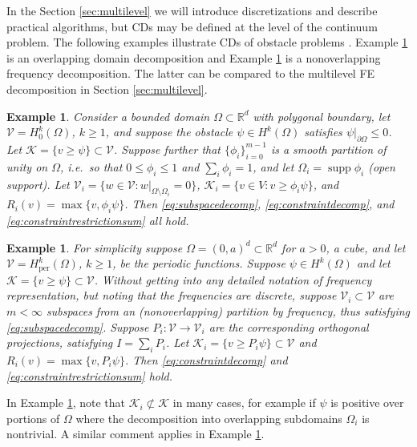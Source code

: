 \documentclass[letterpaper,final,12pt,reqno]{amsart}
\theoremstyle{cstyle}
\theoremstyle{dstyle}
\newtheorem{example}[theorem]{Example}
\numberwithin{equation}{section}
\numberwithin{figure}{section}
\numberwithin{table}{section}
\numberwithin{theorem}{section}
\newcommand{\RR}{\mathbb{R}}
\newcommand{\cK}{\mathcal{K}}
\newcommand{\cV}{\mathcal{V}}
\newcommand{\supp}{\operatorname{supp}}
\begin{document}
In the Section \ref{sec:multilevel} we will introduce discretizations and describe practical algorithms, but CDs may be defined at the level of the continuum problem.  The following examples illustrate CDs of obstacle problems \cite{GraeserKornhuber2009}.   Example \ref{ex:domaindecomposition} is an overlapping domain decomposition and Example \ref{ex:frequencydecomposition} is a nonoverlapping frequency decomposition.  The latter can be compared to the multilevel FE decomposition in Section \ref{sec:multilevel}.

\begin{example}  \label{ex:domaindecomposition}  Consider a bounded domain $\Omega \subset \RR^d$ with polygonal boundary, let $\cV = H_0^k(\Omega)$, $k\ge 1$, and suppose the obstacle $\psi \in H^k(\Omega)$ satisfies $\psi|_{\partial \Omega} \le 0$.  Let $\cK = \{v \ge \psi\} \subset \cV$.  Suppose further that $\{\phi_i\}_{i=0}^{m-1}$ is a smooth partition of unity on $\Omega$, i.e.~so that $0 \le \phi_i\le 1$ and $\sum_i \phi_i = 1$, and let $\Omega_i = \supp \phi_i$ (open support).  Let $\cV_i = \{w \in \cV:w|_{\Omega \setminus \Omega_i} =0 \}$, $\cK_i = \{v \in V: v \ge \phi_i \psi\}$, and $R_i(v) = \max\{v,\phi_i \psi\}$.  Then \eqref{eq:subspacedecomp}, \eqref{eq:constraintdecomp}, and \eqref{eq:constraintrestrictionsum} all hold.
\end{example}

\begin{example}  \label{ex:frequencydecomposition}  For simplicity suppose $\Omega = (0,a)^d \subset \RR^d$ for $a>0$, a cube, and let $\cV = H_{\text{per}}^k(\Omega)$, $k\ge 1$, be the periodic functions.  Suppose $\psi \in H^k(\Omega)$ and let $\cK = \{v \ge \psi\} \subset \cV$.  Without getting into any detailed notation of frequency representation, but noting that the frequencies are discrete, suppose $\cV_i \subset \cV$ are $m<\infty$ subspaces from an (nonoverlapping) partition by frequency, thus satisfying \eqref{eq:subspacedecomp}.  Suppose $P_i:\cV \to \cV_i$ are the corresponding orthogonal projections, satisfying $I = \sum_i P_i$.  Let $\cK_i = \{v \ge P_i \psi\} \subset \cV$ and $R_i(v) = \max\{v,P_i \psi\}$.  Then \eqref{eq:constraintdecomp} and \eqref{eq:constraintrestrictionsum} hold.
\end{example}

In Example \ref{ex:domaindecomposition}, note that $\cK_i \not\subset \cK$ in many cases, for example if $\psi$ is positive over portions of $\Omega$ where the decomposition into overlapping subdomains $\Omega_i$ is nontrivial.  A similar comment applies in Example \ref{ex:frequencydecomposition}.
\end{document}

